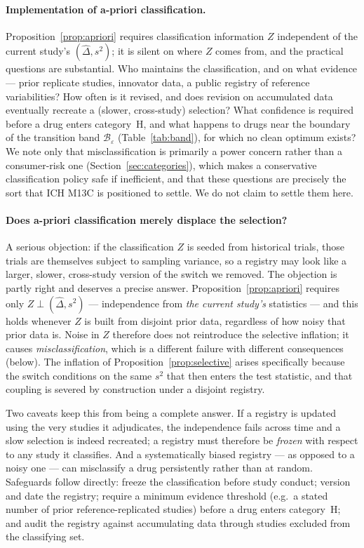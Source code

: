 \documentclass[11pt]{article}
\theoremstyle{remark}
\newcommand{\Dhat}{\hat{\Delta}}
\begin{document}
\paragraph{Implementation of a-priori classification.} Proposition~\ref{prop:apriori} requires classification information $Z$ independent of the current study's $(\Dhat,s^2)$; it is silent on where $Z$ comes from, and the practical questions are substantial. Who maintains the classification, and on what evidence --- prior replicate studies, innovator data, a public registry of reference variabilities? How often is it revised, and does revision on accumulated data eventually recreate a (slower, cross-study) selection? What confidence is required before a drug enters category~H, and what happens to drugs near the boundary of the transition band $\mathcal{B}_\varepsilon$ (Table~\ref{tab:band}), for which no clean optimum exists? We note only that misclassification is primarily a power concern rather than a consumer-risk one (Section~\ref{sec:categories}), which makes a conservative classification policy safe if inefficient, and that these questions are precisely the sort that ICH M13C is positioned to settle. We do not claim to settle them here.

\paragraph{Does a-priori classification merely displace the selection?} A serious objection: if the classification $Z$ is seeded from historical trials, those trials are themselves subject to sampling variance, so a registry may look like a larger, slower, cross-study version of the switch we removed. The objection is partly right and deserves a precise answer. Proposition~\ref{prop:apriori} requires only $Z\perp(\Dhat,s^2)$ --- independence from \emph{the current study's} statistics --- and this holds whenever $Z$ is built from disjoint prior data, regardless of how noisy that prior data is. Noise in $Z$ therefore does not reintroduce the selective inflation; it causes \emph{misclassification}, which is a different failure with different consequences (below). The inflation of Proposition~\ref{prop:selective} arises specifically because the switch conditions on the same $s^2$ that then enters the test statistic, and that coupling is severed by construction under a disjoint registry.

Two caveats keep this from being a complete answer. If a registry is updated using the very studies it adjudicates, the independence fails across time and a slow selection is indeed recreated; a registry must therefore be \emph{frozen} with respect to any study it classifies. And a systematically biased registry --- as opposed to a noisy one --- can misclassify a drug persistently rather than at random. Safeguards follow directly: freeze the classification before study conduct; version and date the registry; require a minimum evidence threshold (e.g.\ a stated number of prior reference-replicated studies) before a drug enters category~H; and audit the registry against accumulating data through studies excluded from the classifying set.
\end{document}
